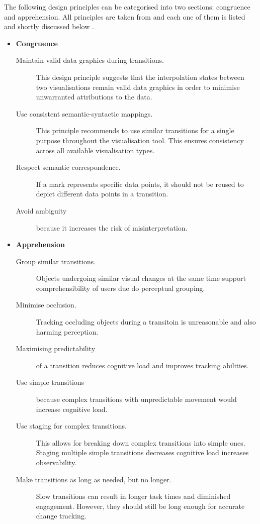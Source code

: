 The following design principles can be categorised into two sections: congruence and apprehension. All principles are taken from \citeauthor{Heer2007} and each one of them is listed and shortly discussed below .
\newpage
\begin{itemize}
\item \textbf{Congruence}
\begin{description}
\item[Maintain valid data graphics during transitions.] This design principle suggests that the interpolation states between two visualisations remain valid data graphics in order to minimise unwarranted attributions to the data.
\item[Use consistent semantic-syntactic mappings.] This principle recommends to use similar transitions for a single purpose throughout the visualisation tool. This ensures consistency across all available visualisation types.
\item[Respect semantic correspondence.] If a mark represents specific data points, it should not be reused to depict different data points in a transition.
\item[Avoid ambiguity] because it increases the risk of misinterpretation.
\end{description}

\item \textbf{Apprehension}
\begin{description}
\item[Group similar transitions.] Objects undergoing similar visual changes at the same time support comprehensibility of users due do perceptual grouping.
\item[Minimise occlusion.] Tracking occluding objects during a transitoin is unreasonable and also harming perception.
\item[Maximising predictability] of a transition reduces cognitive load and improves tracking abilities.
\item[Use simple transitions] because complex transitions with unpredictable movement would increase cognitive load.
\item[Use staging for complex transitions.] This allows for breaking down complex transitions into simple ones. Staging multiple simple transitions decreases cognitive load increases observability.
\item[Make transitions as long as needed, but no longer.] Slow transitions can result in longer task times and diminished engagement. However, they should still be long enough for accurate change tracking.
\end{description}

\end{itemize}

